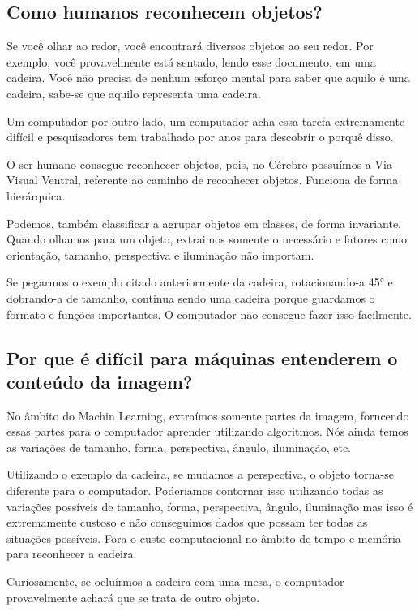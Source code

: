 \documentclass[12pt]{article}
\begin{document}
	\subsection{Como humanos reconhecem objetos?}
	
	Se você olhar ao redor, você encontrará diversos objetos ao seu redor. Por exemplo, você provavelmente está sentado, lendo esse documento, em uma cadeira. Você não precisa de nenhum esforço mental para saber que aquilo é uma cadeira, sabe-se que aquilo representa uma cadeira.
	
	Um computador por outro lado, um computador acha essa tarefa extremamente difícil e pesquisadores tem trabalhado por anos para descobrir o porquê disso.
	
	O ser humano consegue reconhecer objetos, pois, no Cérebro possuímos a Via Visual Ventral, referente ao caminho de reconhecer objetos. Funciona de forma hierárquica.
	
	Podemos, também classificar a agrupar objetos em classes, de forma invariante. Quando olhamos para um objeto, extraimos somente o necessário e fatores como orientação, tamanho, perspectiva e iluminação não importam.
	
	Se pegarmos o exemplo citado anteriormente da cadeira, rotacionando-a 45° e dobrando-a de tamanho, continua sendo uma cadeira porque guardamos o formato e funções importantes. O computador não consegue fazer isso facilmente.
	
	\subsection{Por que é difícil para máquinas entenderem o conteúdo da imagem?}
	
	No âmbito do Machin Learning, extraímos somente partes da imagem, forncendo essas partes para o computador aprender utilizando algoritmos. Nós ainda temos as variações de tamanho, forma, perspectiva, ângulo, iluminação, etc.
	
	Utilizando o exemplo da cadeira, se mudamos a perspectiva, o objeto torna-se diferente para o computador. Poderiamos contornar isso utilizando todas as variações possíveis de tamanho, forma, perspectiva, ângulo, iluminação mas isso é extremamente custoso e não conseguimos dados que possam ter todas as situações possíveis. Fora o custo computacional no âmbito de tempo e memória para reconhecer a cadeira.
	
	Curiosamente, se ocluírmos a cadeira com uma mesa, o computador provavelmente achará que se trata de outro objeto.
	\newpage
\end{document}
